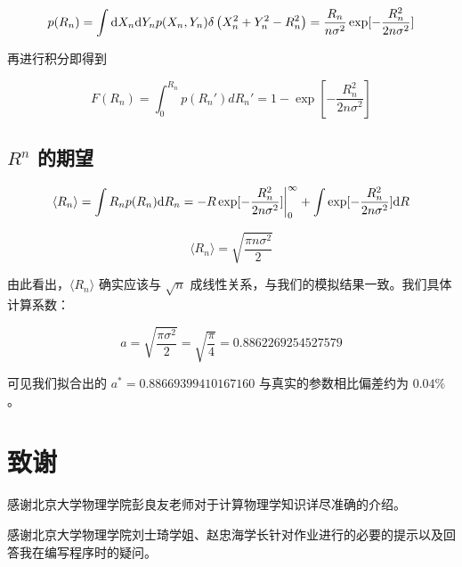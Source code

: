 \documentclass{ctexart}
\begin{document}
$$
p(R_n)=\int \mathrm{d} X_n\mathrm{d} Y_n p(X_n,Y_n)\delta\left(X_n^2+Y_n^2-R_n^2\right)=\frac{R_n}{n\sigma^2}\exp[-\frac{R_n^2}{2n\sigma^2}]
$$

再进行积分即得到

$$
F(R_n)=\int_0^{R_n} p(R_n')dR_n'=1-\exp[-\frac{R_n^2}{2n\sigma^2}]
$$

\subsection{$R^n$ 的期望}

$$
\langle R_n\rangle=\int R_n p(R_n)\mathrm{d} R_n=-R\exp[-\frac{R_n^2}{2n\sigma^2}]\bigg|^\infty_0+\int\exp[-\frac{R_n^2}{2n\sigma^2}] \mathrm{d} R
$$

$$
\langle R_n\rangle=\sqrt{\frac{\pi n\sigma^2}{2}}
$$

由此看出，$\langle R_n\rangle$ 确实应该与 $\sqrt n$ 成线性关系，与我们的模拟结果一致。我们具体计算系数：

$$
a=\sqrt{\frac{\pi\sigma^2}2}=\sqrt{\frac\pi4}=0.8862269254527579
$$

可见我们拟合出的 $a^* = 0.88669399410167160$ 与真实的参数相比偏差约为 $0.04\%$。
\newpage
\appendix
\section{致谢}
感谢北京大学物理学院彭良友老师对于计算物理学知识详尽准确的介绍。

感谢北京大学物理学院刘士琦学姐、赵忠海学长针对作业进行的必要的提示以及回答我在编写程序时的疑问。
\newpage
\end{document}
